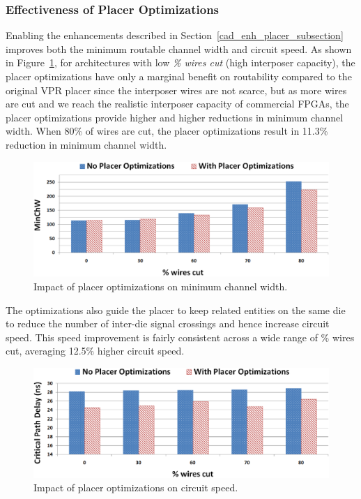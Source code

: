 \documentclass[journal]{IEEEtran}
\begin{document}
\subsubsection{Effectiveness of Placer Optimizations}
\label{sec:effectiveness_of_placer_enhancements}
Enabling the enhancements described in Section~\ref{cad_enh_placer_subsection} improves both the minimum routable channel width and circuit speed. As shown in Figure~\ref{fig:comparison_minW}, for architectures with low \textit{\% wires cut} (high interposer capacity), the placer optimizations have only a marginal benefit on routability compared to the original VPR placer since the interposer wires are not scarce, but as more wires are cut and we reach the realistic interposer capacity of commercial FPGAs, the placer optimizations provide higher and higher reductions in minimum channel width. When 80\% of wires are cut, the placer optimizations result in 11.3\% reduction in minimum channel width.

\begin{figure}[!htbp]
\centering
\includegraphics[width=\linewidth]{placer_opt_minChW.eps}
\caption{Impact of placer optimizations on minimum channel width.}
\label{fig:comparison_minW}
\end{figure}

The optimizations also guide the placer to keep related entities on the same die to reduce the number of inter-die signal crossings and hence increase circuit speed. This speed improvement is fairly consistent across a wide range of \% wires cut, averaging 12.5\% higher circuit speed.
\begin{figure}[!htbp]
\centering
\includegraphics[width=\linewidth]{placer_opt_fmax.eps}
\caption{Impact of placer optimizations on circuit speed.}
\label{fig:comparison_fmax}
\end{figure}
\end{document}
